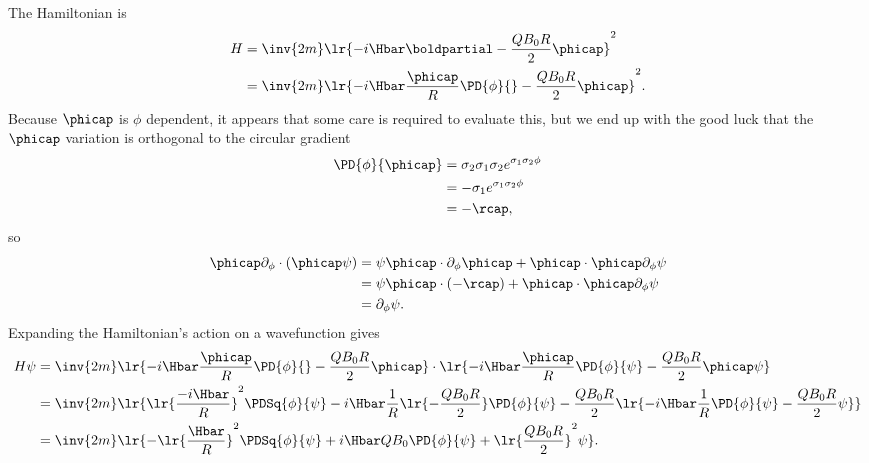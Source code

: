 %
%
The Hamiltonian is
%
\begin{equation}\label{eqn:gradQuantumProblemSet3Problem2:140}
\begin{aligned}
H
&= \inv{ 2 m} \lr{ -i \Hbar \boldpartial - \frac{Q B_0 R}{2} \phicap }^2
\\ &= \inv{2 m} \lr{ -i \Hbar \frac{\phicap}{R} \PD{\phi}{} - \frac{Q B_0 R}{2} \phicap }^2.
\end{aligned}
\end{equation}
%
Because \( \phicap \) is \( \phi \) dependent, it appears that some care is required to evaluate this, but we end up with the good luck that the \( \phicap \) variation is orthogonal to the circular gradient
%
\begin{equation}\label{eqn:gradQuantumProblemSet3Problem2:80}
\begin{aligned}
\PD{\phi}{\phicap}
&= \sigma_2 \sigma_1 \sigma_2 e^{ \sigma_1 \sigma_2 \phi}
\\ &= -\sigma_1 e^{ \sigma_1 \sigma_2 \phi}
\\ &= -\rcap,
\end{aligned}
\end{equation}
%
so
\begin{equation}\label{eqn:gradQuantumProblemSet3Problem2:160}
\begin{aligned}
\phicap \partial_\phi \cdot (\phicap \psi)
&=
\psi \phicap \cdot \partial_\phi \phicap
+ \phicap \cdot \phicap \partial_\phi \psi
\\ &=
\psi \phicap \cdot (-\rcap)
+ \phicap \cdot \phicap \partial_\phi \psi
\\ &=
\partial_\phi \psi.
\end{aligned}
\end{equation}
%
Expanding the Hamiltonian's action on a wavefunction gives
%
\begin{equation}\label{eqn:gradQuantumProblemSet3Problem2:180}
\begin{aligned}
H \psi
&=
\inv{2 m} \lr{ -i \Hbar \frac{\phicap}{R} \PD{\phi}{} - \frac{Q B_0 R}{2} \phicap } \cdot \lr{ -i \Hbar \frac{\phicap}{R} \PD{\phi}{\psi} - \frac{Q B_0 R}{2} \phicap \psi }
\\ &=
\inv{2 m}
\lr{ \lr{ \frac{-i \Hbar}{R} }^2 \PDSq{\phi}{\psi}
-i \Hbar \frac{1}{R} \lr{ - \frac{Q B_0 R}{2} } \PD{\phi}{\psi}
- \frac{Q B_0 R}{2} \lr{ -i \Hbar \frac{1}{R} \PD{\phi}{\psi} - \frac{Q B_0 R}{2} \psi }
}
\\ &=
\inv{2 m}
\lr{
-\lr{ \frac{\Hbar}{R} }^2 \PDSq{\phi}{\psi}
+ i \Hbar Q B_0 \PD{\phi}{\psi}
+ \lr{ \frac{Q B_0 R}{2} }^2 \psi
}.
\end{aligned}
\end{equation}
